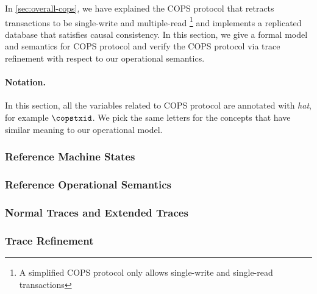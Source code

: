In \cref{sec:overall-cops}, we have explained the COPS protocol 
that retracts transactions to be single-write and multiple-read%
\footnote{A simplified COPS protocol only allows single-write and single-read transactions}
and implements a replicated database that satisfies causal consistency.
In this section, we give a formal model and semantics for COPS protocol
and verify the COPS protocol via trace refinement with respect to our operational semantics.

\paragraph{Notation.}
In this section, all the variables related to COPS protocol are annotated with \emph{hat}, 
for example \( \copstxid \).
We pick the same letters for the concepts that have similar meaning to our operational model.

\subsubsection{Reference Machine States} \label{sec:cops-model}  
\subsubsection{Reference Operational Semantics} \label{sec:cops-semantics}  
\subsubsection{Normal Traces and Extended Traces} \label{sec:cops-normal-trace}  
\label{sec:cops-extended-trace}  
\subsubsection{Trace Refinement} \label{sec:cops-encode}  
